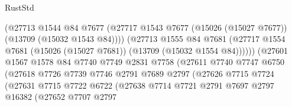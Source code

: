 \begin{lexlean}{RustStd}
\begin{coremodule}
                                      (@27713
                                        @1544
                                        @84
                                        @7677
                                        (@27717
                                          @1543
                                          @7677
                                          (@15026 (@15027 @7677))
                                          (@13709 (@15032 @1543 @84))))
                                      (@27713
                                        @1555
                                        @84
                                        @7681
                                        (@27717
                                          @1554
                                          @7681
                                          (@15026 (@15027 @7681))
                                          (@13709 (@15032 @1554 @84))))))
                                  (@27601
                                    @1567
                                    @1578
                                    @84
                                    @7740
                                    @7749
                                    @2831
                                    @7758
                                    (@27611
                                      @7740
                                      @7747
                                      @6750
                                      (@27618
                                        @7726
                                        @7739
                                        @7746
                                        @2791
                                        @7689
                                        @2797
                                        (@27626
                                          @7715
                                          @7724
                                          (@27631
                                            @7715
                                            @7722
                                            @6722
                                            (@27638
                                              @7714
                                              @7721
                                              @2791
                                              @7697
                                              @2797
                                              @16382
                                              (@27652
                                                @7707
                                                @2797

\end{coremodule}
\end{lexlean}
